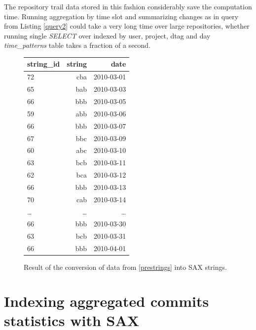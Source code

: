 \documentclass[a4paper,10pt]{article}
\numberwithin{equation}{subsection}
\begin{document}
The repository trail data stored in this fashion considerably save the computation time. Running aggregation by time slot 
and summarizing changes as in query from Listing \ref{query2} could take a very long time over large repositories, whether running 
single \emph{SELECT} over indexed by user, project, dtag and day \emph{time\_patterns} table takes a fraction of a second.
\newpage

\begin{figure}
  \begin{center}
     \caption{Result of the conversion of data from \ref{prestrings} into SAX strings.}
     \begin{tabularx}{0.4\textwidth}{ | X | r | r |}
      \hline           
       string\_id & string & date\\ 
      \hline    
      72 & cba & 2010-03-01\\ 
      65 & bab & 2010-03-03\\ 
      66 & bbb & 2010-03-05\\ 
      59 & abb & 2010-03-06\\ 
      66 & bbb & 2010-03-07\\ 
      67 & bbc & 2010-03-09\\ 
      60 & abc & 2010-03-10\\ 
      63 & bcb & 2010-03-11\\ 
      62 & bca & 2010-03-12\\ 
      66 & bbb & 2010-03-13\\ 
      70 & cab & 2010-03-14\\ 
      \ldots & \ldots & \ldots \\ 
      66 & bbb & 2010-03-30\\ 
      63 & bcb & 2010-03-31\\ 
      66 & bbb & 2010-04-01\\
      \hline    
     \end{tabularx}
     \label{tab:strings}
  \end{center}
\end{figure}

\section{Indexing aggregated commits statistics with SAX}
\end{document}
